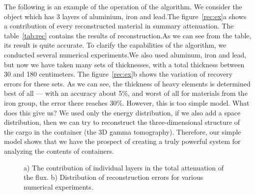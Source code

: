 \documentclass[a4paper]{panl}
\begin{document}
The following is an example of the operation of the algorithm. We consider the object which has 3 layers of aluminium, iron and lead.The figure~\ref{rec:ex}a shows a contribution of every reconstructed material in summary attenuation. The table~\ref{tab:rec} contains the results of reconstruction.As we can see from the table, its result is quite accurate. To clarify the capabilities of the algorithm, we conducted several numerical experiments.We also used aluminum, iron and lead, but now we have taken many sets of thicknesses, with a total thickness between 30 and 180 centimeters. The figure~\ref{rec:ex}b shows the variation of recovery errors for these sets. As we can see, the thickness of heavy elements is determined best of all --- with an accuracy about 5\%, and worst of all for materials from the iron group, the error there reaches 30\%. However, this is too simple model. What does this give us? We used only the energy distribution, if we also add a space distribution, then we can try to reconstruct the three-dimensional structure of the cargo in the container (the 3D gamma tomography). Therefore, our simple model shows that we have the prospect of creating a truly powerful system for analyzing the contents of containers.
\begin{figure}[t]
    \begin{center}
        \begin{minipage}[h]{0.49\linewidth}
\end{minipage}
\hfill
\begin{minipage}[h]{0.49\linewidth}
\end{minipage}
        \vspace{-3mm}
        \caption{a) The contribution of individual layers in the total attenuation of the flux. b) Distribution of reconstruction errors for various numerical experiments.}
    \end{center}
    \vspace{-5mm}
\end{figure}
\end{document}
